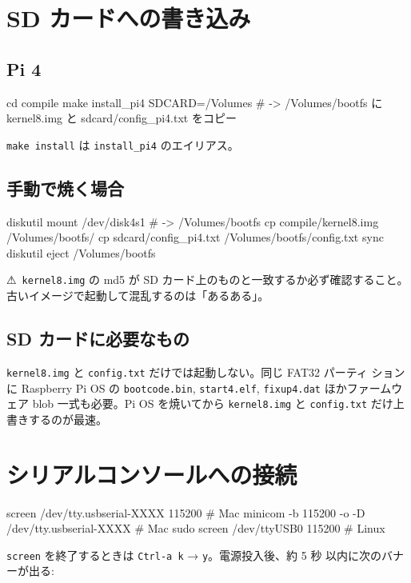 \documentclass[a4paper,11pt]{ltjsarticle}
\begin{document}
\section{SD カードへの書き込み}

\subsection{Pi 4}
\begin{code}
cd compile
make install_pi4 SDCARD=/Volumes
# -> /Volumes/bootfs に kernel8.img と sdcard/config_pi4.txt をコピー
\end{code}
\verb|make install| は \verb|install_pi4| のエイリアス。

\subsection{手動で焼く場合}
\begin{code}
diskutil mount /dev/disk4s1                # -> /Volumes/bootfs
cp compile/kernel8.img /Volumes/bootfs/
cp sdcard/config_pi4.txt /Volumes/bootfs/config.txt
sync
diskutil eject /Volumes/bootfs
\end{code}
⚠~\verb|kernel8.img| の md5 が SD カード上のものと一致するか必ず確認すること。
古いイメージで起動して混乱するのは「あるある」。

\subsection{SD カードに必要なもの}
\verb|kernel8.img| と \verb|config.txt| だけでは起動しない。同じ FAT32 パーティ
ションに Raspberry Pi OS の \verb|bootcode.bin|, \verb|start4.elf|,
\verb|fixup4.dat| ほかファームウェア blob 一式も必要。Pi OS を焼いてから
\verb|kernel8.img| と \verb|config.txt| だけ上書きするのが最速。

\section{シリアルコンソールへの接続}
\begin{code}
screen /dev/tty.usbserial-XXXX 115200                       # Mac
minicom -b 115200 -o -D /dev/tty.usbserial-XXXX             # Mac
sudo screen /dev/ttyUSB0 115200                             # Linux
\end{code}
\verb|screen| を終了するときは \verb|Ctrl-a k| → \verb|y|。電源投入後、約 5 秒
以内に次のバナーが出る:
\end{document}
